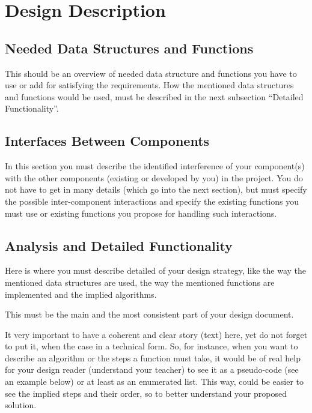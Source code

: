\section{Design Description}

\subsection{Needed Data Structures and Functions}

This should be an overview of needed data structure and functions you have to use or add for satisfying the requirements. How the mentioned data structures and functions would be used, must be described in the next subsection ``Detailed Functionality''.


\subsection{Interfaces Between Components}

In this section you must describe the identified interference of your component(s) with the other components (existing or developed by you) in the project. You do not have to get in many details (which go into the next section), but must specify the possible inter-component interactions and specify the existing functions you must use or existing functions you propose for handling such interactions. 


\subsection{Analysis and Detailed Functionality}

Here is where you must describe detailed of your design strategy, like the way the mentioned data structures are used, the way the mentioned functions are implemented and the implied algorithms. 

This must be the main and the most consistent part of your design document.

It very important to have a coherent and clear story (text) here, yet do not forget to put it, when the case in a technical form. So, for instance, when you want to describe an algorithm or the steps a function must take, it would be of real help for your design reader (understand your teacher) to see it as a pseudo-code (see an example below) or at least as an enumerated list. This way, could be easier to see the implied steps and their order, so to better understand your proposed solution.


